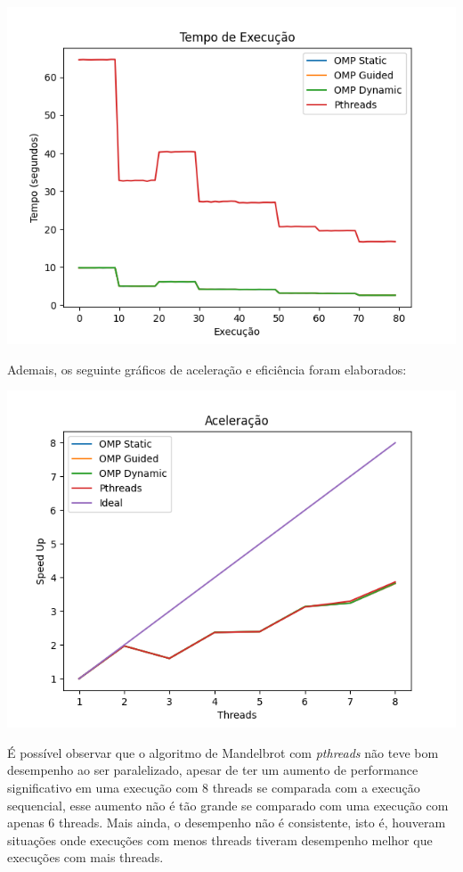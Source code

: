 \documentclass[10pt,a4paper]{article}
\begin{document}
		\includegraphics[scale=.7]{TempoExecução.png}
		
		Ademais, os seguinte gráficos de aceleração e eficiência foram elaborados:
		
		\includegraphics[scale=.7]{Aceleração.png}
		\clearpage

		É possível observar que o algoritmo de Mandelbrot com \textit{pthreads} não teve bom desempenho ao ser paralelizado, apesar de 
		ter um aumento de performance significativo em uma execução com 8 threads se comparada com a execução sequencial, 
		esse aumento não é tão grande se comparado com uma execução com apenas 6 threads. Mais ainda, o desempenho não é consistente, isto é,
		houveram situações onde execuções com menos threads tiveram desempenho melhor que execuções com mais threads.
\end{document}
